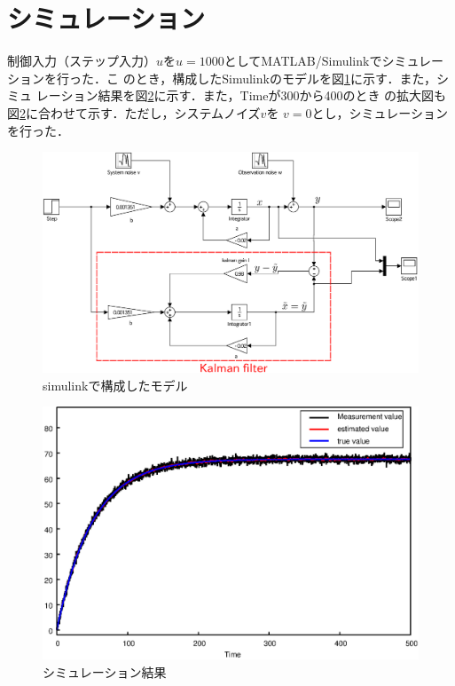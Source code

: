 \documentclass[a4paper,12pt]{jarticle}
\begin{document}
\section{シミュレーション}
制御入力（ステップ入力）$u$を$u=1000$としてMATLAB/Simulinkでシミュレーションを行った．こ
のとき，構成したSimulinkのモデルを図\ref{fig:kalman_b}に示す．また，シミュ
レーション結果を図\ref{fig:kalman_g}に示す．また，Timeが300から400のとき
の拡大図も図\ref{fig:kalman_g}に合わせて示す．ただし，システムノイズ$v$を
$v=0$とし，シミュレーションを行った．
%
\begin{figure}[bp]
 \begin{center}
  \includegraphics[width = 150mm]{fig/kalmanfilter2.eps}
 \end{center}
 \caption{simulinkで構成したモデル}
 \label{fig:kalman_b}
\end{figure}
%
\begin{figure}[htbp]
 \begin{center}
  \includegraphics[width = 150mm]{fig/kalmanfilterG.eps}
 \end{center}
 \caption{シミュレーション結果}
 \label{fig:kalman_g}
\end{figure}
\end{document}
